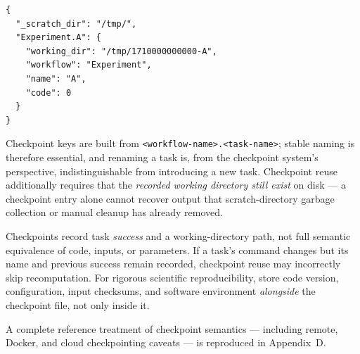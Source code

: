 \begin{lstlisting}[caption={Representative checkpoint JSON shape.}]
{
  "_scratch_dir": "/tmp/",
  "Experiment.A": {
    "working_dir": "/tmp/1710000000000-A",
    "workflow": "Experiment",
    "name": "A",
    "code": 0
  }
}
\end{lstlisting}

Checkpoint keys are built from \texttt{<workflow-name>.<task-name>}; stable
naming is therefore essential, and renaming a task is, from the checkpoint
system's perspective, indistinguishable from introducing a new task.
Checkpoint reuse additionally requires that the \emph{recorded working
directory still exist} on disk --- a checkpoint entry alone cannot recover
output that scratch-directory garbage collection or manual cleanup has
already removed.

\begin{cautionbox}
Checkpoints record task \emph{success} and a working-directory path, not full
semantic equivalence of code, inputs, or parameters. If a task's command
changes but its name and previous success remain recorded, checkpoint reuse
may incorrectly skip recomputation. For rigorous scientific reproducibility,
store code version, configuration, input checksums, and software environment
\emph{alongside} the checkpoint file, not only inside it.
\end{cautionbox}

A complete reference treatment of checkpoint semantics --- including remote,
Docker, and cloud checkpointing caveats --- is reproduced in Appendix~D.

